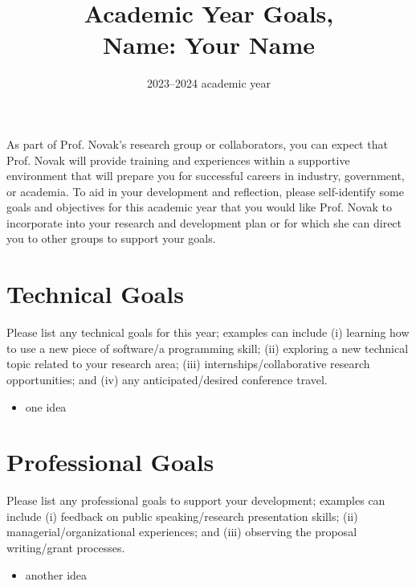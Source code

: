 \documentclass[12pt,twoside]{article}
\date{2023--2024 academic year}
\title{Academic Year Goals,\\Name: Your Name} %
\begin{document}
\maketitle

As part of Prof. Novak's research group or collaborators, you can expect that Prof. Novak will provide training and experiences within a supportive environment that will prepare you for successful careers in industry, government, or academia. To aid in your development and reflection, please self-identify some goals and objectives for this academic year that you would like Prof. Novak to incorporate into your research and development plan or for which she can direct you to other groups to support your goals.

\section{Technical Goals}

Please list any technical goals for this year; examples can include (i) learning how to use a new piece of software/a programming skill; (ii) exploring a new technical topic related to your research area; (iii) internships/collaborative research opportunities; and (iv) any anticipated/desired conference travel.

\begin{itemize}
\item one idea
\end{itemize}

\section{Professional Goals}

Please list any professional goals to support your development; examples can include (i) feedback on public speaking/research presentation skills; (ii) managerial/organizational experiences; and (iii) observing the proposal writing/grant processes.

\begin{itemize}
\item another idea
\end{itemize}
\end{document}
